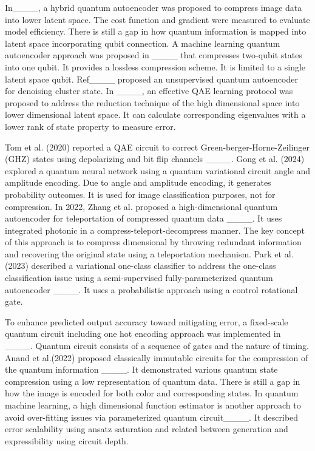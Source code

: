 In____, a hybrid quantum autoencoder was proposed to compress image data into lower latent space. The cost function and gradient were measured to evaluate model efficiency. There is still a gap in how quantum information is mapped into latent space incorporating qubit connection. A machine learning quantum autoencoder approach was proposed in ____ that compresses two-qubit states into one qubit. It provides a lossless compression scheme. It is limited to a single latent space qubit. Ref____ proposed an unsupervised quantum autoencoder for denoising cluster state. In ____, an effective QAE  learning protocol was proposed to address the reduction technique of the high dimensional space into lower dimensional latent space. It can calculate corresponding eigenvalues with a lower rank of state property to measure error. 

Tom et al. (2020) reported a QAE circuit to correct Green-berger-Horne-Zeilinger (GHZ) states using depolarizing and bit flip channels ____. Gong et al. (2024) explored a quantum neural network using a quantum variational circuit angle and amplitude encoding. Due to angle and amplitude encoding, it generates probability outcomes. It is used for image classification purposes, not for compression. In 2022, Zhang et al. proposed a high-dimensional quantum autoencoder for teleportation of compressed quantum data ____. It uses integrated photonic in a compress-teleport-decompress manner. The key concept of this approach is to compress dimensional by throwing redundant information and recovering the original state using a teleportation mechanism. Park et al. (2023) described a variational one-class classifier to address the one-class classification issue using a semi-supervised fully-parameterized quantum autoencoder ____. It uses a probabilistic approach using a control rotational gate. 

To enhance predicted output accuracy toward mitigating error, a fixed-scale quantum circuit including one hot encoding approach was implemented in ____. Quantum circuit consists of a sequence of gates and the nature of timing. Anand et al.(2022) proposed classically immutable circuits for the compression of the quantum information ____. It demonstrated various quantum state compression using a low representation of quantum data. There is still a gap in how the image is encoded for both color and corresponding states. In quantum machine learning, a high dimensional function estimator is another approach to avoid over-fitting issues via parameterized quantum circuit____. It described error scalability using ansatz saturation and related between generation and expressibility using circuit depth.  

